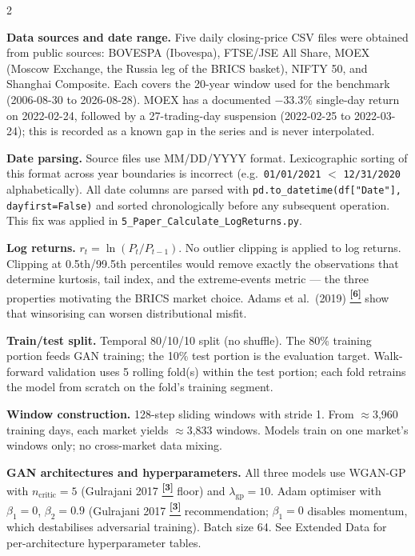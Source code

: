 \documentclass[10pt]{article}
\newcommand{\tcite}[1]{%
  \hyperlink{R:#1}{\textsuperscript{\scriptsize\textbf{[#1]}}}}
\begin{document}
\begin{multicols}{2}
\small

\textbf{Data sources and date range.}
Five daily closing-price CSV files were obtained from public sources: BOVESPA (Ibovespa), FTSE/JSE All Share, MOEX (Moscow Exchange, the Russia leg of the BRICS basket), NIFTY 50, and Shanghai Composite. Each covers the 20-year window used for the benchmark (2006-08-30 to 2026-08-28). MOEX has a documented $-33.3\%$ single-day return on 2022-02-24, followed by a 27-trading-day suspension (2022-02-25 to 2022-03-24); this is recorded as a known gap in the series and is never interpolated.

\textbf{Date parsing.}
Source files use MM/DD/YYYY format. Lexicographic sorting of this format across year boundaries is incorrect (e.g.\ \texttt{01/01/2021} $<$ \texttt{12/31/2020} alphabetically). All date columns are parsed with \texttt{pd.to\_datetime(df["Date"], dayfirst=False)} and sorted chronologically before any subsequent operation. This fix was applied in \texttt{5\_Paper\_Calculate\_LogReturns.py}.

\textbf{Log returns.}
$r_t = \ln(P_t / P_{t-1})$. No outlier clipping is applied to log returns. Clipping at 0.5th/99.5th percentiles would remove exactly the observations that determine kurtosis, tail index, and the extreme-events metric --- the three properties motivating the BRICS market choice. Adams et al.\ (2019)\tcite{6} show that winsorising can worsen distributional misfit.

\textbf{Train/test split.}
Temporal 80/10/10 split (no shuffle). The 80\% training portion feeds GAN training; the 10\% test portion is the evaluation target. Walk-forward validation uses 5 rolling fold(s) within the test portion; each fold retrains the model from scratch on the fold's training segment.

\textbf{Window construction.}
128-step sliding windows with stride 1. From $\approx$3{,}960 training days, each market yields $\approx$3{,}833 windows. Models train on one market's windows only; no cross-market data mixing.

\textbf{GAN architectures and hyperparameters.}
All three models use WGAN-GP with $n_\text{critic}=5$ (Gulrajani 2017\tcite{3} floor) and $\lambda_\text{gp}=10$. Adam optimiser with $\beta_1=0$, $\beta_2=0.9$ (Gulrajani 2017\tcite{3} recommendation; $\beta_1=0$ disables momentum, which destabilises adversarial training). Batch size 64. See Extended Data for per-architecture hyperparameter tables.


\end{multicols}
\end{document}
